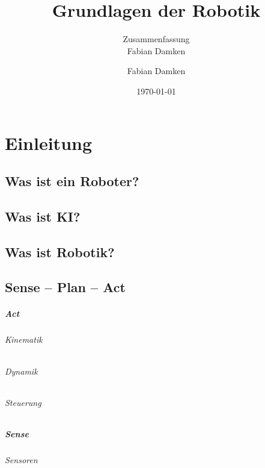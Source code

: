 \documentclass[a4paper, 11pt, accentcolor = tud3b]{tudreport}
\title{Grundlagen der Robotik}
\subtitle{Zusammenfassung \\ Fabian Damken}
\author{Fabian Damken}
\date{\today}
\begin{document}
	\maketitle
	\tableofcontents
	\listoftodos

	\chapter{Einleitung} %

		\section{Was ist ein Roboter?} %

		\section{Was ist KI?} %

		\section{Was ist Robotik?} %

		\section{Sense -- Plan -- Act} %

			\paragraph{Act} %

				\subparagraph{Kinematik} %

				\subparagraph{Dynamik} %

				\subparagraph{Steuerung} %

			\paragraph{Sense} %

				\subparagraph{Sensoren} %
\end{document}

